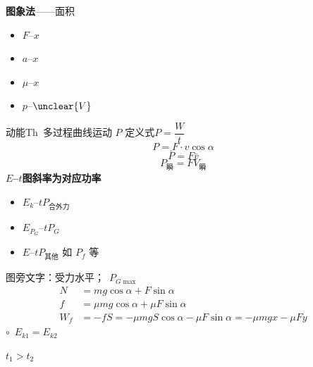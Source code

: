 \textbf{图象法}——面积
\begin{itemize}
\item $F$--$x$
\item $a$--$x$
\item $\mu$--$x$
\item $p$--$\unclear{V}$
\end{itemize}
动能Th\ 多过程曲线运动
$P$ 定义式\quad $P=\dfrac{W}{t}$
\[
P=F\cdot v\cos\alpha
\]
\[
\bar P=F\bar v
\]
\[
P_{\text{瞬}}=FV_{\text{瞬}}
\]
\textbf{$E$--$t$图斜率为对应功率}
\begin{itemize}
\item $E_k$--$t$\quad $P_{\text{合外力}}$
\item $E_{P_G}$--$t$\quad $P_G$
\item $E$--$t$\quad $P_{\text{其他}}$ 如 $P_f$ 等
\end{itemize}
图旁文字：受力水平；\ $P_{G\max}$
\begin{align*}
N&=mg\cos\alpha+F\sin\alpha\\
f&=\mu mg\cos\alpha+\mu F\sin\alpha\\
W_f&=-fS=-\mu mgS\cos\alpha-\mu F\sin\alpha=-\mu mgx-\mu Fy %
\end{align*}
$\circ$\ $E_{k1}=E_{k2}$ %

\quad $t_1>t_2$

